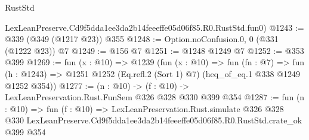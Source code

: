 \begin{lexlean}{RustStd}
\begin{coremodule}
    LexLeanPreserve.Cd9f5dda1ee3da2b14feeeffe05d06f85.R0.RustStd.fun0)
@1243 := @339 (@349 (@1217 @23)) @355
@1248 := Option.noConfusion.{0, 0} (@331 (@1222 @23)) @7
@1249 := @156 @7
@1251 := @1248 @1249 @7
@1252 := @353 @399
@1269 := fun (x : @10) =>
  @1239
    (fun (x : @10) =>
    fun (fn : @7) =>
    fun (h : @1243) => @1251 @1252 (Eq.refl.{2} (Sort 1) @7) (heq_of_eq.{1} @338 @1249 @1252 @354))
@1277 := (n : @10) -> (f : @10) -> LexLeanPreservation.Rust.FunSem @326 @328 @330 @399 @354
@1287 := fun (n : @10) =>
  fun (f : @10) =>
  LexLeanPreservation.Rust.simulate
    @326
    @328
    @330
    LexLeanPreserve.Cd9f5dda1ee3da2b14feeeffe05d06f85.R0.RustStd.crate_ok
    @399
    @354
\end{coremodule}
\end{lexlean}

